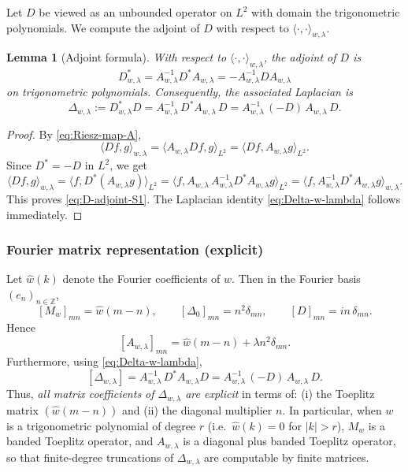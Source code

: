 \documentclass{amsart}
\numberwithin{equation}{section}
\newtheorem{lemma}[theorem]{Lemma}
\theoremstyle{definition}
\theoremstyle{remark}
\begin{document}
Let $D$ be viewed as an unbounded operator on $L^2$ with domain the trigonometric polynomials.
We compute the adjoint of $D$ with respect to $\langle\cdot,\cdot \rangle_{w,\lambda}$.

\begin{lemma}[Adjoint formula]\label{lem:S1-adjoint}
With respect to $\langle\cdot,\cdot \rangle_{w,\lambda}$, the adjoint of $D$ is
\begin{equation}\label{eq:D-adjoint-S1}
D^*_{w,\lambda} = A_{w,\lambda}^{-1} D^* A_{w,\lambda}
= - A_{w,\lambda}^{-1} D A_{w,\lambda}
\end{equation}
on trigonometric polynomials. Consequently, the associated Laplacian is
\begin{equation}\label{eq:Delta-w-lambda}
\Delta_{w,\lambda}:=D^*_{w,\lambda}D
=
A_{w,\lambda}^{-1}\,D^* A_{w,\lambda}\,D
=
A_{w,\lambda}^{-1}\,(-D)\,A_{w,\lambda}\,D.
\end{equation}
\end{lemma}

\begin{proof}
By \eqref{eq:Riesz-map-A},
\[
\langle Df,g\rangle_{w,\lambda}
=\langle A_{w,\lambda}Df,g\rangle_{L^2}
=\langle Df,A_{w,\lambda}g\rangle_{L^2}.
\]
Since $D^*=-D$ in $L^2$, we get
\[
\langle Df,g\rangle_{w,\lambda}
=
\langle f, D^*(A_{w,\lambda}g)\rangle_{L^2}
=
\langle f, A_{w,\lambda}\,A_{w,\lambda}^{-1}D^*A_{w,\lambda}g\rangle_{L^2}
=
\langle f, A_{w,\lambda}^{-1}D^*A_{w,\lambda}g\rangle_{w,\lambda}.
\]
This proves \eqref{eq:D-adjoint-S1}. The Laplacian identity \eqref{eq:Delta-w-lambda}
follows immediately.
\end{proof}

\subsubsection{Fourier matrix representation (explicit)}

Let $\widehat{w}(k)$ denote the Fourier coefficients of $w$.
Then in the Fourier basis $(e_n)_{n\in\mathbb Z}$,
\[
[M_w]_{mn}=\widehat{w}(m-n),\qquad [\Delta_0]_{mn}=n^2\delta_{mn},
\qquad [D]_{mn}=in\,\delta_{mn}.
\]
Hence
\begin{equation}\label{eq:A-matrix}
[A_{w,\lambda}]_{mn}=\widehat{w}(m-n)+\lambda n^2\delta_{mn}.
\end{equation}
Furthermore, using \eqref{eq:Delta-w-lambda},
\begin{equation}\label{eq:Delta-matrix-explicit}
[\Delta_{w,\lambda}] = A_{w,\lambda}^{-1}\, D^* A_{w,\lambda} D
= A_{w,\lambda}^{-1}\, ( -D)\, A_{w,\lambda}\, D.
\end{equation}
Thus, \emph{all matrix coefficients of $\Delta_{w,\lambda}$ are explicit} in terms of:
(i) the Toeplitz matrix $(\widehat{w}(m-n))$ and (ii) the diagonal multiplier $n$.
In particular, when $w$ is a trigonometric polynomial of degree $r$
(i.e.\ $\widehat w(k)=0$ for $|k|>r$), $M_w$ is a banded Toeplitz operator, and
$A_{w,\lambda}$ is a diagonal plus banded Toeplitz operator, so that
finite-degree truncations of $\Delta_{w,\lambda}$ are computable by finite matrices.
\end{document}
